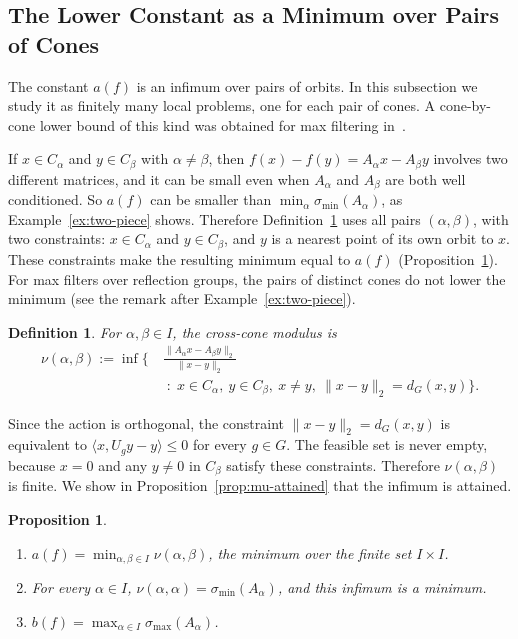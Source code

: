 \documentclass[11pt]{article}
\newcommand{\inner}[2]{\langle #1, #2 \rangle}
\newtheorem{prop}[theor]{Proposition}
\newtheorem{defin}[theor]{Definition}
\theoremstyle{definition}
\begin{document}
\subsection{The Lower Constant as a Minimum over Pairs of Cones}


The constant $a(f)$ is an infimum over pairs of orbits. In this subsection we study it as finitely many local problems, one for each pair of cones. A cone-by-cone lower bound of
this kind was obtained for max filtering in~\cite[Thm.~26, Cor.~30]{mixonqaddura}.

 If $x\in C_{\alpha}$ and $y\in C_{\beta}$ with
$\alpha\neq\beta$, then $f(x)-f(y)=A_{\alpha}x-A_{\beta}y$ involves two different matrices, and it
can be small even when $A_{\alpha}$ and $A_{\beta}$ are both well conditioned. So $a(f)$ can be
smaller than $\min_{\alpha}\sigma_{\min}(A_{\alpha})$, as Example~\ref{ex:two-piece} shows.
Therefore Definition~\ref{def:mu} uses all pairs $(\alpha,\beta)$, with two constraints:
$x\in C_{\alpha}$ and $y\in C_{\beta}$, and $y$ is a nearest point of its own orbit to $x$. These
constraints make the resulting minimum equal to $a(f)$ (Proposition~\ref{thm:formula}). For max
filters over reflection groups, the pairs of distinct cones do not lower the minimum (see the
remark after Example~\ref{ex:two-piece}).

\begin{defin}\label{def:mu}
	For $\alpha,\beta\in I$, the \emph{cross-cone modulus} is
	\[
	\begin{aligned}
	\nu(\alpha,\beta):=\inf\biggl\{\ &\frac{\|A_{\alpha}x-A_{\beta}y\|_2}{\|x-y\|_2}\\
	&\;:\; x\in C_{\alpha},\ y\in C_{\beta},\ x\neq y,\ \|x-y\|_2=d_{G}(x,y)\biggr\}.
	\end{aligned}
	\]
	\end{defin}

Since the action is orthogonal, the constraint $\|x-y\|_2=d_{G}(x,y)$ is equivalent to
$\inner{x}{U_{g}y-y}\le0$ for every $g\in G$. The feasible set is never empty, because
$x=0$ and any $y\neq0$ in $C_{\beta}$ satisfy these constraints. Therefore $\nu(\alpha,\beta)$ is finite. We show in Proposition~\ref{prop:mu-attained} that the infimum is attained.


\begin{prop}\label{thm:formula}
	\leavevmode
	\begin{enumerate}
		\item[(i)] $a(f)=\min_{\alpha,\beta\in I}\nu(\alpha,\beta)$, the minimum over
		the finite set $I\times I$.
		\item[(ii)] For every $\alpha\in I$,
		$\nu(\alpha,\alpha)=\sigma_{\min}(A_{\alpha})$, and this infimum is a minimum.
		\item[(iii)] $b(f)=\max_{\alpha\in I}\sigma_{\max}(A_{\alpha})$.
	\end{enumerate}
\end{prop}
\end{document}
